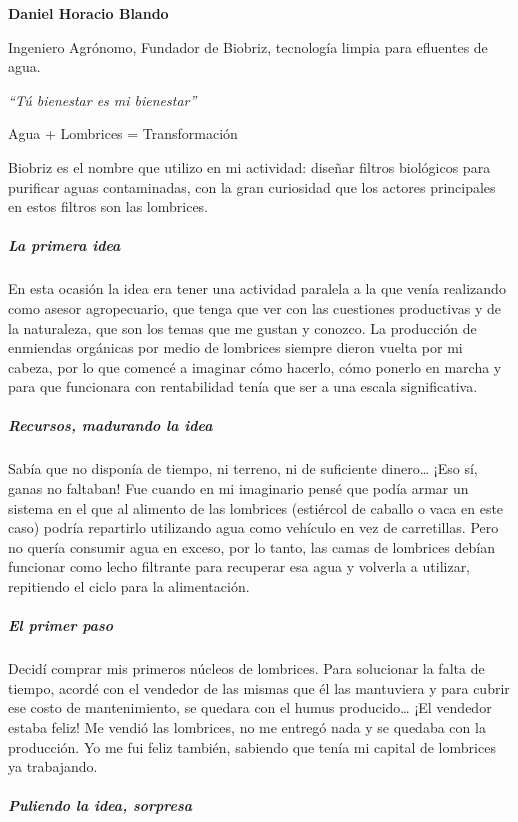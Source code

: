 \documentclass[
]{article}
\begin{document}
\textbf{Daniel Horacio Blando}

Ingeniero Agrónomo, Fundador de Biobriz, tecnología limpia para
efluentes de agua.

\emph{``Tú bienestar es mi bienestar''}

Agua + Lombrices = Transformación

Biobriz es el nombre que utilizo en mi actividad: diseñar filtros
biológicos para purificar aguas contaminadas, con la gran curiosidad que
los actores principales en estos filtros son las lombrices.

\hypertarget{la-primera-idea}{%
\subparagraph{La primera idea}\label{la-primera-idea}}

En esta ocasión la idea era tener una actividad paralela a la que venía
realizando como asesor agropecuario, que tenga que ver con las
cuestiones productivas y de la naturaleza, que son los temas que me
gustan y conozco. La producción de enmiendas orgánicas por medio de
lombrices siempre dieron vuelta por mi cabeza, por lo que comencé a
imaginar cómo hacerlo, cómo ponerlo en marcha y para que funcionara con
rentabilidad tenía que ser a una escala significativa.

\hypertarget{recursos-madurando-la-idea}{%
\subparagraph{Recursos, madurando la
idea}\label{recursos-madurando-la-idea}}

Sabía que no disponía de tiempo, ni terreno, ni de suficiente
dinero\ldots{} ¡Eso sí, ganas no faltaban! Fue cuando en mi imaginario
pensé que podía armar un sistema en el que al alimento de las lombrices
(estiércol de caballo o vaca en este caso) podría repartirlo utilizando
agua como vehículo en vez de carretillas. Pero no quería consumir agua
en exceso, por lo tanto, las camas de lombrices debían funcionar como
lecho filtrante para recuperar esa agua y volverla a utilizar,
repitiendo el ciclo para la alimentación.

\hypertarget{el-primer-paso}{%
\subparagraph{El primer paso}\label{el-primer-paso}}

Decidí comprar mis primeros núcleos de lombrices. Para solucionar la
falta de tiempo, acordé con el vendedor de las mismas que él las
mantuviera y para cubrir ese costo de mantenimiento, se quedara con el
humus producido\ldots{} ¡El vendedor estaba feliz! Me vendió las
lombrices, no me entregó nada y se quedaba con la producción. Yo me fui
feliz también, sabiendo que tenía mi capital de lombrices ya trabajando.

\hypertarget{puliendo-la-idea-sorpresa}{%
\subparagraph{Puliendo la idea,
sorpresa}\label{puliendo-la-idea-sorpresa}}
\end{document}
